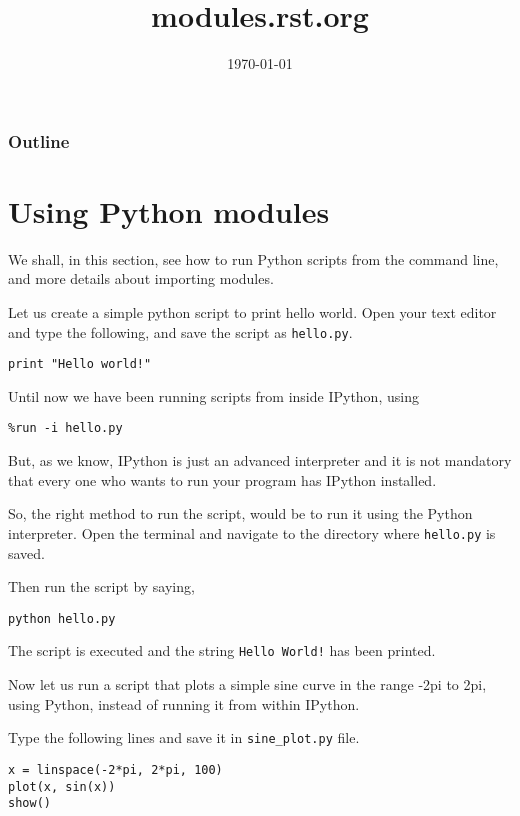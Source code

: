 \documentclass[presentation]{beamer}
\title{modules.rst.org}
\author{}
\date{\today}
\begin{document}
\maketitle

\begin{frame}
\frametitle{Outline}
\setcounter{tocdepth}{3}
\tableofcontents
\end{frame}




\section{Using Python modules}
\label{sec-1}


We shall, in this section, see how to run Python scripts from the
command line, and more details about importing modules.

Let us create a simple python script to print hello world. Open your
text editor and type the following, and save the script as \texttt{hello.py}.

\begin{verbatim}
print "Hello world!"
\end{verbatim}

Until now we have been running scripts from inside IPython, using

\begin{verbatim}
%run -i hello.py
\end{verbatim}

But, as we know, IPython is just an advanced interpreter and it is not
mandatory that every one who wants to run your program has IPython
installed.

So, the right method to run the script, would be to run it using the
Python interpreter. Open the terminal and navigate to the directory
where \texttt{hello.py} is saved.

Then run the script by saying,

\begin{verbatim}
python hello.py
\end{verbatim}

The script is executed and the string \texttt{Hello World!} has been printed.

Now let us run a script that plots a simple sine curve in the range -2pi
to 2pi, using Python, instead of running it from within IPython.

Type the following lines and save it in \texttt{sine\_plot.py} file.

\begin{verbatim}
x = linspace(-2*pi, 2*pi, 100)
plot(x, sin(x))
show()
\end{verbatim}
\end{document}

